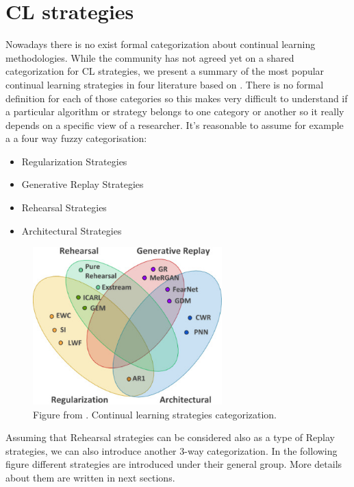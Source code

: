 \documentclass[english, LaM, oneside]{sapthesis}%
\begin{document}
\section{CL strategies}
\label{chap-3-4}
Nowadays there is no exist formal categorization about continual learning methodologies.
While the community has not agreed yet on a shared categorization for CL strategies, we present a summary of the most popular continual learning strategies in four literature based on \cite{kemker,zenke}. There is no formal definition for each of those categories so this makes very difficult to understand if a particular algorithm or strategy belongs to one category or another so it really depends on a specific view of a researcher. It's reasonable to assume for example a a four way fuzzy categorisation:
\begin{itemize}
    \item Regularization Strategies
    \item Generative Replay Strategies
    \item Rehearsal Strategies
    \item Architectural Strategies
\end{itemize}
\begin{figure}[!h]
            \centering
            \includegraphics[width=0.65\textwidth]{cl_strategies.jpg}
            \caption{Figure from \cite{lomonaco}. Continual learning strategies categorization.}
            \label{fig:cl_strategies}
        \end{figure}

Assuming that Rehearsal strategies can be considered also as a type of Replay strategies, we can also introduce another 3-way categorization. In the following figure different strategies are introduced under their general group. More details about them are written in next sections.
\end{document}
